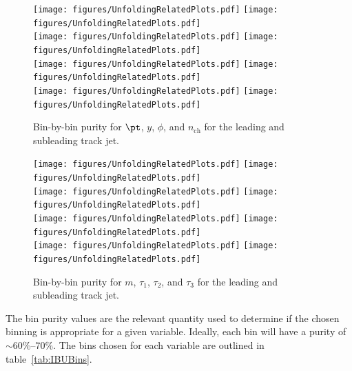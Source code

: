\begin{figure}[h!]
  \centering
  \texttt{[image: figures/UnfoldingRelatedPlots.pdf]}
  \texttt{[image: figures/UnfoldingRelatedPlots.pdf]} \\
  \texttt{[image: figures/UnfoldingRelatedPlots.pdf]}
  \texttt{[image: figures/UnfoldingRelatedPlots.pdf]} \\
  \texttt{[image: figures/UnfoldingRelatedPlots.pdf]}
  \texttt{[image: figures/UnfoldingRelatedPlots.pdf]} \\
  \texttt{[image: figures/UnfoldingRelatedPlots.pdf]}
  \texttt{[image: figures/UnfoldingRelatedPlots.pdf]}
  \caption{Bin-by-bin purity for $\pt$, $y$, $\phi$, and $n_{\text{ch}}$ for the leading and subleading track jet.}
  \label{fig:binPurTJ1}
\end{figure}

\begin{figure}[h!]
  \centering
  \texttt{[image: figures/UnfoldingRelatedPlots.pdf]}
  \texttt{[image: figures/UnfoldingRelatedPlots.pdf]} \\
  \texttt{[image: figures/UnfoldingRelatedPlots.pdf]}
  \texttt{[image: figures/UnfoldingRelatedPlots.pdf]} \\
  \texttt{[image: figures/UnfoldingRelatedPlots.pdf]}
  \texttt{[image: figures/UnfoldingRelatedPlots.pdf]} \\
  \texttt{[image: figures/UnfoldingRelatedPlots.pdf]}
  \texttt{[image: figures/UnfoldingRelatedPlots.pdf]}
  \caption{Bin-by-bin purity for $m$, $\tau_1$, $\tau_2$, and $\tau_3$ for the leading and subleading track jet.}
  \label{fig:binPurTJ2}
\end{figure}

The bin purity values are the relevant quantity used to determine if the chosen binning is appropriate for a given variable. Ideally, each bin will have a purity of $\sim$60\%--70\%. The bins chosen for each variable are outlined in table~\ref{tab:IBUBins}.

